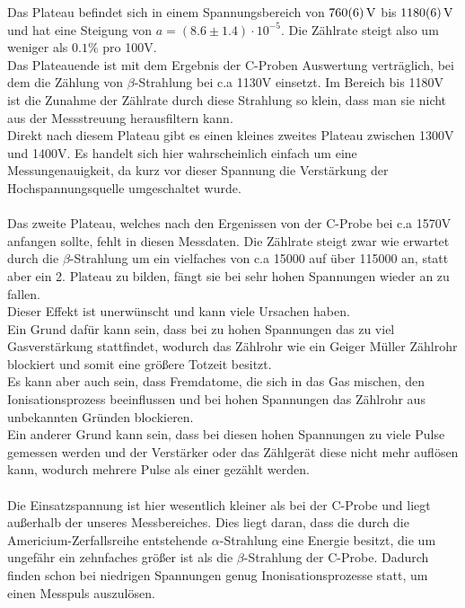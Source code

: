 \documentclass[12pt,a4paper]{article}
\begin{document}
Das Plateau befindet sich in einem Spannungsbereich von $\SI{760\pm 6}{V}$ bis $\SI{1180\pm 6}{V}$ und hat eine Steigung von $a = (8.6\pm1.4)\cdot 10^{-5}$. Die Zählrate steigt also um weniger als $0.1\%$ pro 100V.\\
 Das Plateauende ist mit dem Ergebnis der C-Proben Auswertung verträglich, bei dem die Zählung von $\beta$-Strahlung bei c.a 1130V einsetzt. Im Bereich bis 1180V ist die Zunahme der Zählrate durch diese Strahlung so klein, dass man sie nicht aus der Messstreuung herausfiltern kann.\\
Direkt nach diesem Plateau gibt es einen kleines zweites Plateau zwischen 1300V und 1400V. Es handelt sich hier wahrscheinlich einfach um eine Messungenauigkeit, da kurz vor dieser Spannung die Verstärkung der Hochspannungsquelle umgeschaltet wurde.\\
\\
Das zweite Plateau, welches nach den Ergenissen von der C-Probe bei c.a 1570V anfangen sollte, fehlt in diesen Messdaten. Die Zählrate steigt zwar wie erwartet durch die $\beta$-Strahlung um ein vielfaches von c.a 15000 auf über 115000 an, statt aber ein 2. Plateau zu bilden, fängt sie bei sehr hohen Spannungen wieder an zu fallen.\\
Dieser Effekt ist unerwünscht und kann viele Ursachen haben.\\
Ein Grund dafür kann sein, dass bei zu hohen Spannungen das zu viel Gasverstärkung stattfindet, wodurch das Zählrohr wie ein Geiger Müller Zählrohr blockiert und somit eine größere Totzeit besitzt.\\
Es kann aber auch sein, dass Fremdatome, die sich in das Gas mischen, den Ionisationsprozess beeinflussen und bei hohen Spannungen das Zählrohr aus unbekannten Gründen blockieren.\\
Ein anderer Grund kann sein, dass bei diesen hohen Spannungen zu viele Pulse gemessen werden und der Verstärker oder das Zählgerät diese nicht mehr auflösen kann, wodurch mehrere Pulse als einer gezählt werden.\\
\\
Die Einsatzspannung ist hier wesentlich kleiner als bei der C-Probe und liegt außerhalb der unseres Messbereiches. Dies liegt daran, dass die durch die Americium-Zerfallsreihe entstehende $\alpha$-Strahlung eine Energie besitzt, die 
um ungefähr ein zehnfaches größer ist als die $\beta$-Strahlung der C-Probe. Dadurch finden schon bei niedrigen Spannungen genug Inonisationsprozesse statt, um einen Messpuls auszulösen.\\
\end{document}
